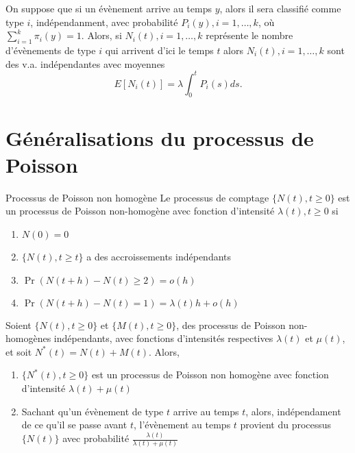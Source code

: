\begin{proposition}{}{}
	On suppose que si un évènement arrive au temps $y$, alors il sera classifié comme type $i$, indépendanment, avec probabilité $P_i(y), i = 1, \dots, k$, où $\sum_{i = 1}^{k}\pi_i(y) = 1.$ Alors, si $N_i(t), i = 1, \dots, k$ représente le nombre d'évènements de type $i$ qui arrivent d'ici le temps $t$ alors $N_i(t), i = 1, \dots, k$ sont des v.a. indépendantes avec moyennes 
	$$E[N_i(t)] = \lambda \int_{0}^{t}P_i(s) ds. $$
\end{proposition}

\section{Généralisations du processus de Poisson}

\begin{definition}{Processus de Poisson non homogène}{}
	Le processus de comptage $\{N(t), t\geq 0\}$ est un processus de Poisson non-homogène avec fonction d'intensité $\lambda(t), t\geq 0$ si 
	\begin{enumerate}
		\item $\displaystyle N(0) = 0$
		\item $\displaystyle \{N(t), t\geq t\}$ a des accroissements indépendants
		\item $\displaystyle \Pr(N(t + h) - N(t) \geq 2) = o(h)$
		\item $\displaystyle \Pr(N(t + h) - N(t) = 1) = \lambda(t) h + o(h)$
	\end{enumerate}
\end{definition}

\begin{proposition}{}{}
	Soient $\{N(t), t \geq 0\}$ et $\{M(t), t\geq 0\}$, des processus de Poisson non-homogènes indépendants, avec fonctions d'intensités respectives $\lambda(t)$ et $\mu(t)$, et soit $N^*(t) = N(t) + M(t)$. Alors, 
	\begin{enumerate}
		\item $\{N^*(t), t\geq 0\}$ est un processus de Poisson non homogène avec fonction d'intensité $\lambda(t) + \mu(t)$
		\item Sachant qu'un évènement de type $t$ arrive au temps $t$, alors, indépendament de ce qu'il se passe avant $t$, l'évènement au temps $t$ provient du processus $\{N(t)\}$ avec probabilité $\frac{\lambda(t)}{\lambda(t) + \mu(t)}$
	\end{enumerate}
\end{proposition}

